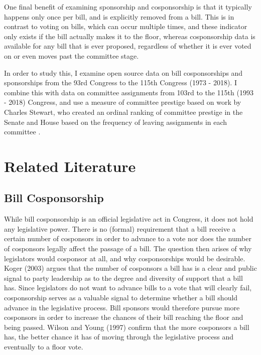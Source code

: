 \documentclass{article}
\begin{document}
One final benefit of examining sponsorship and cosponsorship is that it typically happens only once per bill, and is explicitly removed from a bill. This is in contrast to voting on bills, which can occur multiple times, and these indicator only exists if the bill actually makes it to the floor, whereas cosponsorship data is available for any bill that is ever proposed, regardless of whether it is ever voted on or even moves past the committee stage. 

In order to study this, I examine open source data on bill cosponsorships and sponsorships from the 93rd Congress to the 115th Congress (1973 - 2018). I combine this with data on committee assignments from 103rd to the 115th (1993 - 2018) Congress, and use a measure of committee prestige based on work by Charles Stewart, who created an ordinal ranking of committee prestige in the Senate and House based on the frequency of leaving assignments in each committee \cite{stewart-committee-values}.


\section{Related Literature}
\subsection{Bill Cosponsorship}
While bill cosponsorship is an official legislative act in Congress, it does not hold any legislative power. There is no (formal) requirement that a bill receive a certain number of cosponsors in order to advance to a vote nor does the number of cosponsors legally affect the passage of a bill. The question then arises of why legislators would cosponsor at all, and why cosponsorships would be desirable. Koger (2003) \cite{koger2003} argues that the number of cosponsors a bill has is a clear and public signal to party leadership as to the degree and diversity of support that a bill has. Since legislators do not want to advance bills to a vote that will clearly fail, cosponsorship serves as a valuable signal to determine whether a bill should advance in the legislative process. Bill sponsors would therefore pursue more cosponsors in order to increase the chances of their bill reaching the floor and being passed. Wilson and Young (1997) \cite{wilson_young1997} confirm that the more cosponsors a bill has, the better chance it has of moving through the legislative process and eventually to a floor vote.
\end{document}
